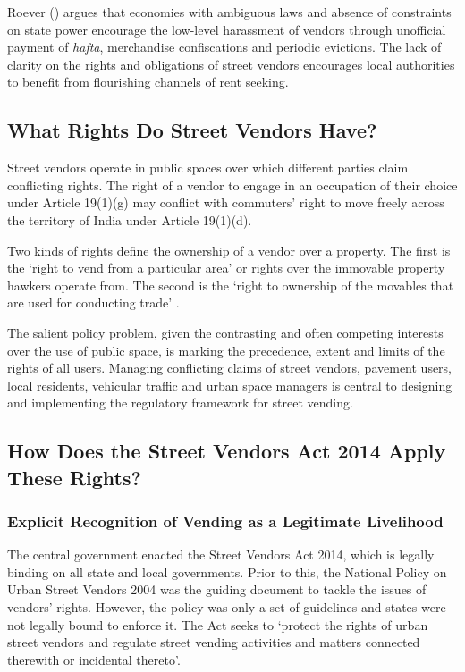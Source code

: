 \documentclass[a4paper, 12pt, twoside]{article}
\begin{document}
{Roever (\cite*{sallypaper}) argues that economies with ambiguous laws and absence of constraints on state power encourage the low-level harassment of vendors through unofficial payment of \textit{hafta}, merchandise confiscations and periodic evictions. The lack of clarity on the rights and obligations of street vendors encourages local authorities to benefit from flourishing channels of rent seeking. 

\subsection*{What Rights Do Street Vendors Have?}
Street vendors operate in public spaces over which different parties claim conflicting rights. The right of a  vendor to engage in an occupation of their choice under Article 19(1)(g) may conflict with commuters’ right to move freely across the territory of India under Article 19(1)(d). 

Two kinds of rights define the ownership of a vendor over a property. The first is the `right to vend from a particular area' or rights over the immovable property hawkers operate from. The second is the `right to ownership of the movables that are used for conducting trade' \parencite{ccspaper}.

The salient policy problem, given the contrasting and often competing interests over the use of public space, is marking the precedence, extent and limits of the rights of all users. Managing conflicting claims of street vendors, pavement users, local residents, vehicular traffic and urban space managers is central to designing and implementing the regulatory framework for street vending.
\newpage
\subsection*{How Does the Street Vendors Act 2014 Apply These Rights?}

\subsubsection*{Explicit Recognition of Vending as a Legitimate Livelihood}

The central government enacted the Street Vendors Act 2014, which is legally binding on all state and local governments. Prior to this, the National Policy on Urban Street Vendors 2004 was the guiding document to tackle the issues of vendors’ rights. However, the policy was only a set of guidelines and states were not legally bound to enforce it. The Act seeks to `protect the rights of urban street vendors and regulate street vending activities and matters connected therewith or incidental thereto'.

}
\end{document}
